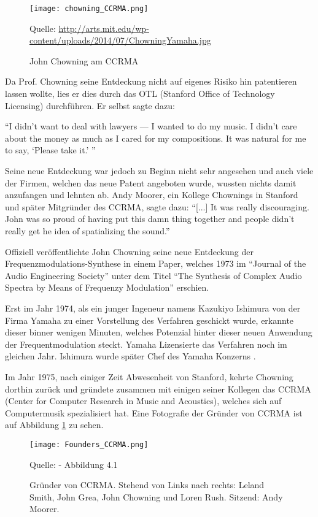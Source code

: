 \begin{figure} [ht]
\centering
  \texttt{[image: chowning\_CCRMA.png]}
\caption{John Chowning am CCRMA}
Quelle: \url{http://arts.mit.edu/wp-content/uploads/2014/07/ChowningYamaha.jpg}
\end{figure}
 
Da Prof. Chowning seine Entdeckung nicht auf eigenes Risiko hin patentieren lassen wollte, lies er dies durch das OTL (Stanford Office of Technology Licensing) durchführen. Er selbst sagte dazu:

``I didn’t want to deal with lawyers — I wanted to do my music. I didn’t care about the money as much as I cared for my compositions. It was natural for me to say, `Please take it.' ''\cite{fatherofdigitalmusik}

 Seine neue Entdeckung war jedoch zu Beginn nicht sehr angesehen und auch viele der Firmen, welchen das neue Patent angeboten wurde, wussten nichts damit anzufangen und lehnten ab. Andy Moorer, ein Kollege Chownings in Stanford und später Mitgründer des CCRMA, sagte dazu: ``[...] It was really discouraging. John was so proud of having put this damn thing together and people didn't really get he idea of spatializing the sound.''\cite[s. xy]{soundofinnovation}

Offiziell veröffentlichte John Chowning seine neue Entdeckung der Frequenzmodulations-Synthese in einem Paper, welches 1973 im ``Journal of the Audio Engineering Society'' unter dem Titel ``The Synthesis of Complex Audio Spectra by Means of Frequenzy Modulation'' erschien.

Erst im Jahr 1974, als ein junger Ingeneur namens Kazukiyo Ishimura von der Firma Yamaha zu einer Vorstellung des Verfahren geschickt wurde, erkannte dieser binner wenigen Minuten, welches Potenzial hinter dieser neuen Anwendung der Frequentmodulation steckt. Yamaha Lizensierte das Verfahren noch im gleichen Jahr. Ishimura wurde später Chef des Yamaha Konzerns \cite{fatherofdigitalmusik}.

Im Jahr 1975, nach einiger Zeit Abwesenheit von Stanford, kehrte Chowning dorthin zurück und gründete zusammen mit einigen seiner Kollegen das CCRMA (Center for Computer Research in Music and Acoustics), welches sich auf Computermusik spezialisiert hat.
Eine Fotografie der Gründer von CCRMA ist auf Abbildung \ref{fig:foundersCCRMA} zu sehen.

\begin{figure} [ht]
\centering
  \texttt{[image: Founders\_CCRMA.png]}
\caption{Gründer von CCRMA. Stehend von Links nach rechts: Leland Smith, John Grea, John Chowning und Loren Rush. Sitzend: Andy Moorer.}
\label{fig:foundersCCRMA}
Quelle: \cite{soundofinnovation} - Abbildung 4.1
\end{figure}

